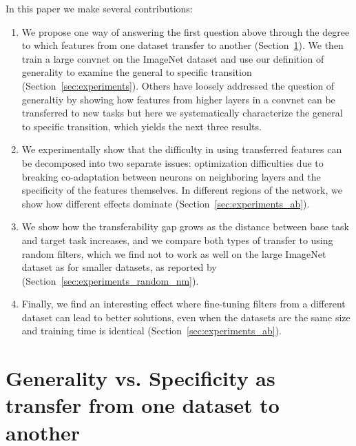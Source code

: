 In this paper we make several contributions:

\begin{enumerate}
\item We propose one way of answering the first question above through the degree to which features from one dataset transfer to another (Section~\ref{sec:definition}). We then train a large convnet on the ImageNet dataset and use our definition of generality to examine the general to specific transition (Section~\ref{sec:experiments}).
Others have loosely addressed the question of generaltiy by showing how features from higher layers in a convnet can be transferred to new tasks \cite{donahue+jia-2013-arxiv} but here we systematically characterize the general to specific transition, which yields the next three results.
\item We experimentally show that the difficulty in using transferred features can be decomposed into two separate issues: optimization difficulties due to breaking co-adaptation between neurons on neighboring layers and the specificity of the features themselves. In different regions of the network, we show how different effects dominate (Section~\ref{sec:experiments_ab}).
\item We show how the transferability gap grows as the distance between base
task and target task increases, and we compare both types of transfer to using random filters, which we find not to work as well on the large ImageNet dataset as for smaller datasets, as reported by \cite{Jarrett-ICCV2009} (Section~\ref{sec:experiments_random_nm}).
\item Finally, we find an interesting effect where fine-tuning filters from a different dataset can lead to better solutions, even when the datasets are the same size and training time is identical (Section~\ref{sec:experiments_ab}).
\end{enumerate}






\section{Generality vs. Specificity as transfer from one dataset to another}
\label{sec:definition}

